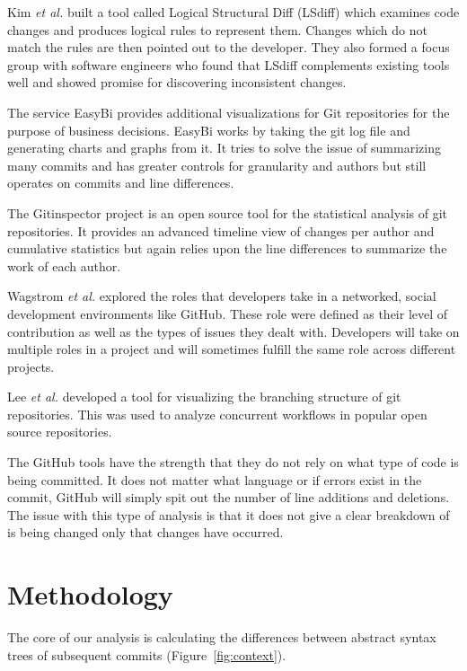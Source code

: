 \documentclass[conference]{IEEEtran}
\begin{document}
Kim \textit{et al.} \cite{Kim:2009:DRS:1555001.1555046} built a tool called Logical Structural Diff (LSdiff) which examines code changes and produces logical rules to represent them. Changes which do not match the rules are then pointed out to the developer. They also formed a focus group with software engineers who found that LSdiff complements existing tools well and showed promise for discovering inconsistent changes.

The service EasyBi \cite{EasyBi} provides additional visualizations for Git repositories for the purpose of business decisions. EasyBi works by taking the git log file and generating charts and graphs from it. It tries to solve the issue of summarizing many commits and has greater controls for granularity and authors but still operates on commits and line differences.

The Gitinspector project \cite{Gitinspector} is an open source tool for the statistical analysis of git repositories. It provides an advanced timeline view of changes per author and cumulative statistics but again relies upon the line differences to summarize the work of each author.

Wagstrom \textit{et al.} \cite{Patrick:Wagstrom:2012} explored the roles that developers take in a networked, social development environments like GitHub. These role were defined as their level of contribution as well as the types of issues they dealt with. Developers will take on multiple roles in a project and will sometimes fulfill the same role across different projects.

Lee \textit{et al.} \cite{lee2013} developed a tool for visualizing the branching structure of git repositories. This was used to analyze concurrent workflows in popular open source repositories.

The GitHub tools have the strength that they do not rely on what type of code is being committed. It does not matter what language or if errors exist in the commit, GitHub will simply spit out the number of line additions and deletions. The issue with this type of analysis is that it does not give a clear breakdown of is being changed only that changes have occurred.

\section{Methodology}
\label{sec:methodology}

The core of our analysis is calculating the differences between abstract syntax trees of subsequent commits (Figure~\ref{fig:context}).
\end{document}
